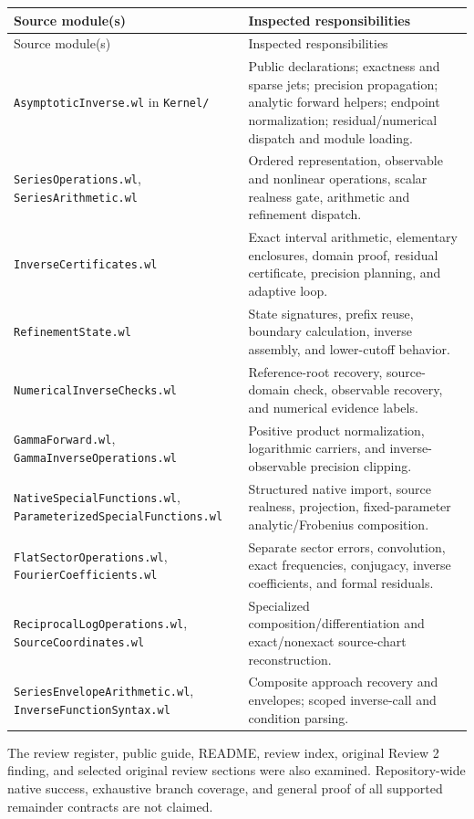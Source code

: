 \documentclass[11pt,letterpaper]{article}
\begin{document}
\begin{longtable}{@{}p{}p{}@{}}
\toprule
Source module(s) & Inspected responsibilities\\
\midrule\endfirsthead
\toprule Source module(s) & Inspected responsibilities\\\midrule\endhead
\nolinkurl{AsymptoticInverse.wl} in \nolinkurl{Kernel/} & Public declarations; exactness and sparse jets; precision propagation; analytic forward helpers; endpoint normalization; residual/numerical dispatch and module loading.\\[5pt]
\nolinkurl{SeriesOperations.wl}, \nolinkurl{SeriesArithmetic.wl} & Ordered representation, observable and nonlinear operations, scalar realness gate, arithmetic and refinement dispatch.\\[5pt]
\nolinkurl{InverseCertificates.wl} & Exact interval arithmetic, elementary enclosures, domain proof, residual certificate, precision planning, and adaptive loop.\\[5pt]
\nolinkurl{RefinementState.wl} & State signatures, prefix reuse, boundary calculation, inverse assembly, and lower-cutoff behavior.\\[5pt]
\nolinkurl{NumericalInverseChecks.wl} & Reference-root recovery, source-domain check, observable recovery, and numerical evidence labels.\\[5pt]
\nolinkurl{GammaForward.wl}, \nolinkurl{GammaInverseOperations.wl} & Positive product normalization, logarithmic carriers, and inverse-observable precision clipping.\\[5pt]
\nolinkurl{NativeSpecialFunctions.wl}, \nolinkurl{ParameterizedSpecialFunctions.wl} & Structured native import, source realness, projection, fixed-parameter analytic/Frobenius composition.\\[5pt]
\nolinkurl{FlatSectorOperations.wl}, \nolinkurl{FourierCoefficients.wl} & Separate sector errors, convolution, exact frequencies, conjugacy, inverse coefficients, and formal residuals.\\[5pt]
\nolinkurl{ReciprocalLogOperations.wl}, \nolinkurl{SourceCoordinates.wl} & Specialized composition/differentiation and exact/nonexact source-chart reconstruction.\\[5pt]
\nolinkurl{SeriesEnvelopeArithmetic.wl}, \nolinkurl{InverseFunctionSyntax.wl} & Composite approach recovery and envelopes; scoped inverse-call and condition parsing.\\
\bottomrule
\end{longtable}
The review register, public guide, README, review index, original Review 2 finding, and selected original review sections were also examined. Repository-wide native success, exhaustive branch coverage, and general proof of all supported remainder contracts are not claimed.
\end{document}
